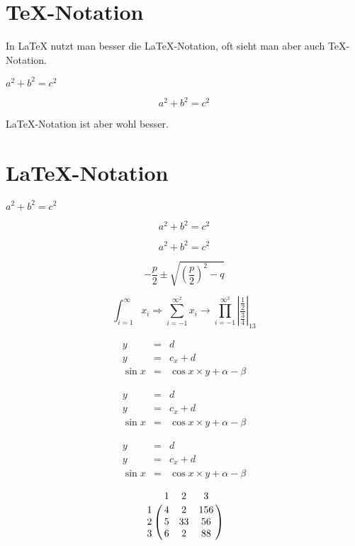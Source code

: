 \documentclass[12pt,ngerman,parskip=half]{scrartcl}
\begin{document}
\section{\TeX-Notation}

In LaTeX nutzt man besser die LaTeX-Notation, oft sieht man aber auch TeX-Notation.

$a^2+b^2=c^2$

$$a^2+b^2=c^2$$

\LaTeX-Notation ist aber wohl besser.

\section{\LaTeX-Notation}

\( a^2 + b^2 = c^2 \)

\[ a^2 + b^2 = c^2 \]

\begin{equation}
a^2 + b^2 = c^2
\end{equation}

\begin{equation}
-\frac{p}{2} \pm \sqrt{  \left(\frac{p}{2}\right)^2 - q  }
\end{equation}

\begin{equation}
\int_{i=1}^{\infty} x_i \Rightarrow \sum_{i=-1}^{\infty^2} x_i \rightarrow \prod_{i=-1}^{\infty^2} \left|    \frac{\frac{1}{2}}{\frac{3}{4}}         \right|_{13} 
\end{equation}

\begin{eqnarray}
y &=& d \\
y &=& c_x +d \\
\sin x &=& \cos x \times y + \alpha - \beta
\end{eqnarray}


\begin{eqnarray*}
y &=& d \\
y &=& c_x +d \\
\sin x &=& \cos x \times y + \alpha - \beta
\end{eqnarray*}

\[
\begin{array}{lcr}
y &=& d \\
y &=& c_x +d \\
\sin x &=& \cos x \times y + \alpha - \beta
\end{array}
\]

\[
\bordermatrix{
   & 1 & 2 & 3 \cr
1 & 4 & 2 & 156 \cr
2 & 5 & 33 & 56 \cr
3 & 6 & 2 & 88 \cr
}
\]
\end{document}

